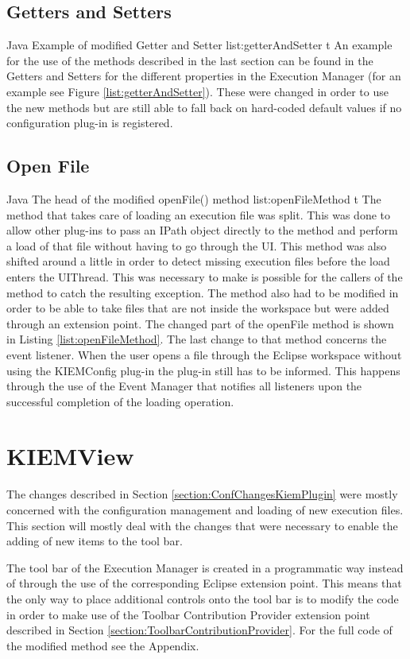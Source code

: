 \subsection{Getters and Setters}
\listingjava
{}
{Java}
{Example of modified Getter and Setter}
{list:getterAndSetter}
{t}
An example for the use of the methods described in the last section can be found in the Getters and Setters for
the different properties in the Execution Manager (for an example see Figure \ref{list:getterAndSetter}). 
These were changed in order to use the new methods but are
still able to fall back on hard-coded default values if no configuration plug-in is registered.


\subsection{Open File}
\label{section:ConfKiemOpenFile}
\listingjava
{}
{Java}
{The head of the modified openFile() method}
{list:openFileMethod}
{t}
The method that takes care of loading an execution file was split. This was done to allow
other plug-ins to pass an IPath object directly to the method and perform a load of that file without
having to go through the \ac{UI}. This method was also shifted around a little in order to detect
missing execution files before the load enters the \ac{UI}Thread. This was necessary to make is possible for
the callers of the method to catch the resulting exception.
The method also had to be modified in order to be able to take files that are not inside the workspace
but were added through an extension point. The changed part of the openFile method is shown in 
Listing \ref{list:openFileMethod}.
The last change to that method concerns the event listener. When the user opens a file through the
Eclipse workspace without using the \ac{KIEMConfig} plug-in the plug-in still has to be informed.
This happens through the use of the Event Manager that notifies all listeners upon the successful
completion of the loading operation.


\section{KIEMView}
\label{section:ConfChangesKiemView}
The changes described in Section \ref{section:ConfChangesKiemPlugin} were mostly concerned with the
configuration management and loading of new execution files. This section will mostly deal with the changes
that were necessary to enable the adding of new items to the tool bar.

The tool bar of the Execution Manager is created in a programmatic way instead of through the use of the
corresponding Eclipse extension point. This means that the only way to place additional controls onto the tool bar
is to modify the code in order to make use of the Toolbar Contribution Provider extension point described
in Section \ref{section:ToolbarContributionProvider}. For the full code of the modified method see the
Appendix.
